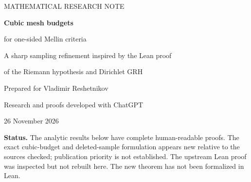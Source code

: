 \documentclass[11pt]{article}
\theoremstyle{definition}
\newcommand{\ep}{\varepsilon}
\newcommand{\Rea}{\operatorname{Re}}
\newcommand{\dd}{\,\mathrm d}
\begin{document}
\hypersetup{pageanchor=false}
\begin{titlepage}
\vspace*{0.8cm}
{\color{accent}\large MATHEMATICAL RESEARCH NOTE\par}
\vspace{0.7cm}
{\color{ink}\Huge\bfseries Cubic mesh budgets\par}
\vspace{0.2cm}
{\color{ink}\LARGE for one-sided Mellin criteria\par}
\vspace{0.8cm}
{\large A sharp sampling refinement inspired by the Lean proof\par
of the Riemann hypothesis and Dirichlet GRH\par}
\vspace{1cm}
{\large Prepared for Vladimir Reshetnikov\par}
{\normalsize Research and proofs developed with ChatGPT\par
26 November 2026\par}
\vspace{1cm}
\begin{abstract}
For a nonnegative arithmetic weight sequence, its ramp sum
\(C(x)=\sum_n w_n(x/n-1)_+\) is convex. We prove a sharp sampling theorem
for the centered error \(E(x)=C(x)-ax\log x-cx\), with \(a>0\).
The relevant geometric cost of a sampling gap \([A,B]\) is its integrated
chord defect, which is asymptotic to
\((B-A)^3/(12A^{\theta+2})\) under the Mellin weight
\(x^{-\theta-1}\dd x\).
If the cumulative cubic cost grows more slowly than every positive power
and the sample values satisfy one-sided bounds of order
\(x^{\theta+\ep}\), then the positive-part Mellin transform converges
throughout \(\Rea s>\theta\). A classical Landau argument then removes
all poles there whenever the real residues have the appropriate sign.

An explicit application retains fourth powers but deletes growing blocks
of consecutive samples. Its gaps include infinitely many intervals of
length \(\sim4X^{5/6}\), while its critical cubic budget is only
\(O(\log X)\). This exceeds the \(X^{3/4}\) maximum-gap scale of the
existing pointwise sampling criterion. A single globally defined
nonnegative weight sequence attains every interpolation defect, proving
sharpness within the class controlled only by convexity and sample values.
\end{abstract}
\vfill
\noindent\textbf{Status.} The analytic results below have complete human-readable
proofs. The exact cubic-budget and deleted-sample formulation appears new
relative to the sources checked; publication priority is not established.
The upstream Lean proof was inspected but not rebuilt here. The new theorem
has not been formalized in Lean.
\end{titlepage}
\hypersetup{pageanchor=true}
\tableofcontents
\newpage
{}
\end{document}
